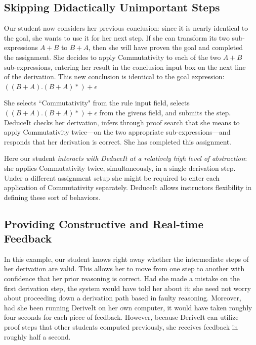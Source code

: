 \documentclass{sigchi}
\newcommand{\msb}[1]{\textbf{\textcolor{cyan}{Michael: #1}}}
\begin{document}
\subsection{Skipping Didactically Unimportant Steps}
Our student now considers her previous conclusion: since it is nearly identical to the goal, she wants to use it for her next step. If she can transform its two sub-expressions $A+B$ to $B+A$, then she will have proven the goal and completed the assignment. She decides to apply Commutativity to each of the two $A+B$ sub-expressions, entering her result in the conclusion input box on the next line of the derivation. This new conclusion is identical to the goal expression: $((B+A).(B+A)*)+\epsilon$

She selects ``Commutativity" from the rule input field, selects $((B+A).(B+A)*)+\epsilon$ from the givens field, and submits the step. DeduceIt checks her derivation, infers through proof search that she means to apply Commutativity twice---on the two appropriate sub-expressions---and responds that her derivation is correct. She has completed this assignment.

Here our student \textit{interacts with DeduceIt at a relatively high level of abstraction}: she applies Commutativity twice, simultaneously, in a single derivation step. Under a different assignment setup she might be required to enter each application of Commutativity separately. DeduceIt allows instructors flexibility in defining these sort of behaviors. %

\subsection{Providing Constructive and Real-time Feedback}

In this example, our student knows right away whether the intermediate steps of her derivation are valid. This allows her to move from one step to another with confidence that her prior reasoning is correct. Had she made a mistake on the first derivation step, the system would have told her about it; she need not worry about proceeding down a derivation path based in faulty reasoning. Moreover, had she been running DeriveIt on her own computer, it would have taken roughly four seconds for each piece of feedback. However, because DeriveIt can utilize proof steps that other students computed previously, she receives feedback in roughly half a second.
\end{document}
